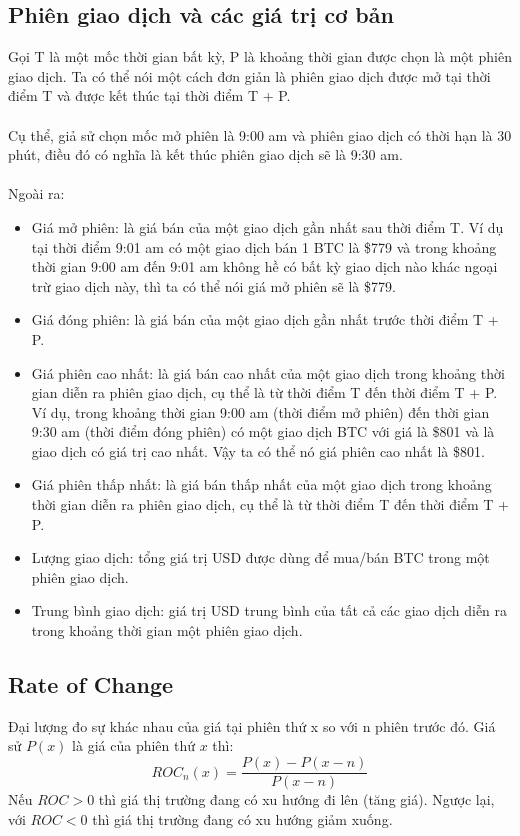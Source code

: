 \subsection{Phiên giao dịch và các giá trị cơ bản}
Gọi T là một mốc thời gian bất kỳ, P là khoảng thời gian được chọn là một phiên 
giao dịch. Ta có thể nói một cách đơn giản là phiên giao dịch được mở tại thời 
điểm T và được kết thúc tại thời điểm T + P.\\\\
Cụ thể, giả sử chọn mốc mở phiên là 9:00 am và phiên giao dịch có thời hạn là 
30 phút, điều đó có nghĩa là kết thúc phiên giao dịch sẽ là 9:30 am.\\\\
Ngoài ra:
\begin{itemize}
\item Giá mở phiên: là giá bán của một giao dịch gần nhất sau thời điểm T. Ví dụ tại thời 
điểm 9:01 am có một giao dịch bán 1 BTC là \$779 và trong khoảng thời gian 9:00 am 
đến 9:01 am không hề có bất kỳ giao dịch nào khác ngoại trừ giao dịch này, thì ta có thể 
nói giá mở phiên sẽ là \$779.
\item Giá đóng phiên: là giá bán của một giao dịch gần nhất trước thời điểm T + P.
\item Giá phiên cao nhất: là giá bán cao nhất của một giao dịch trong khoảng thời gian diễn ra phiên 
giao dịch, cụ thể là từ thời điểm T đến thời điểm T + P. Ví dụ, trong khoảng thời gian 9:00 am (thời điểm 
mở phiên) đến thời gian 9:30 am (thời điểm đóng phiên) có một giao dịch BTC với giá là 
\$801 và là giao dịch có giá trị cao nhất. Vậy ta có thể nó giá phiên cao nhất là 
\$801.
\item Giá phiên thấp nhất: là giá bán thấp nhất của một giao dịch trong khoảng thời gian diễn ra phiên 
giao dịch, cụ thể là từ thời điểm T đến thời điểm T + P.
\item Lượng giao dịch: tổng giá trị USD được dùng để  mua/bán BTC trong một phiên giao dịch.
\item Trung bình giao dịch: giá trị USD trung bình của tất cả các giao dịch diễn 
ra trong khoảng thời gian một phiên giao dịch.
\end{itemize}
\subsection{Rate of Change}
Đại lượng đo sự khác nhau của giá tại phiên thứ x so với n phiên trước đó. 
Giá sử $P(x)$ là giá của phiên thứ $x$ thì:
\[ ROC_{n}(x)=\frac{P(x)-P(x-n)}{P(x-n)}\]
Nếu $ROC > 0$ thì giá thị trường đang có xu hướng đi lên (tăng giá).
Ngược lại, với $ROC < 0$ thì giá thị trường đang có xu hướng giảm xuống.
